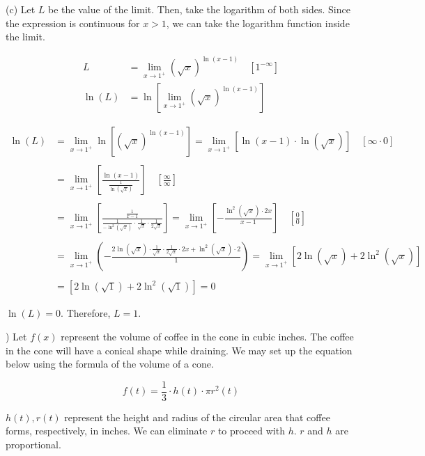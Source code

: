 \documentclass{article}
\begin{document}
\noindent (c) Let $L$ be the value of the limit. Then, take the logarithm of both sides. Since the expression is continuous for $x>1$, we can take the logarithm function inside the limit.

\begin{align*}
L&=\lim_{x\to1^+} (\sqrt x)^{\ln(x-1)}\quad \left[1^{-\infty}\right]\\
\ln(L) &= \ln\left[\lim_{x\to1^+} (\sqrt x)^{\ln(x-1)}\right]
\end{align*}

\begin{align*}
\ln(L)&=\lim_{x\to1^+}\ln\left[(\sqrt x)^{\ln(x-1)}\right]=\lim_{x\to1^+}\left[\ln(x-1)\cdot\ln(\sqrt x)\right]\quad\left[\infty \cdot 0\right]\\\\&=\lim_{x\to1^+}\left[\frac{\ln(x-1)}{\frac1{\ln\left(\sqrt x\right)}}\right]\quad\left[\frac\infty\infty\right]\\\\&=\lim_{x\to1^+}\left[\frac{\frac1{{x-1}}}{\frac1{-\ln^2\left(\sqrt x\right)}\cdot\frac1{\sqrt x}\cdot\frac1{2\sqrt x}}\right]=\lim_{x\to1^+}\left[-\frac{\ln^2(\sqrt x)\cdot 2x}{x-1}\right]\quad\left[\frac00\right]\\\\&=\lim_{x\to1^+}\left(-\frac{2\ln\left(\sqrt x\right)\cdot \frac1{\sqrt x}\cdot\frac1{2\sqrt x}\cdot2x+\ln^2 (\sqrt x)\cdot 2 }1\right)=\lim_{x\to1^+} \left[2\ln\left(\sqrt x\right) + 2\ln^2\left(\sqrt x\right) \right]\\\\&=\left[2\ln\left(\sqrt 1\right) + 2\ln^2\left(\sqrt 1\right) \right] = 0
\end{align*}

\hfill

\noindent $\ln(L) = 0$. Therefore, $\boxed{L=1}$.

\hfill

) Let $f(x)$ represent the volume of coffee in the cone in cubic inches. The coffee in the cone will have a conical shape while draining. We may set up the equation below using the formula of the volume of a cone.

\begin{equation*}f(t) = \frac13\cdot h(t)\cdot \pi r^2(t)\end{equation*}

\hfill

\noindent $h(t), r(t)$ represent the height and radius of the circular area that coffee forms, respectively, in inches. We can eliminate $r$ to proceed with $h$. $r$ and $h$ are proportional.
\end{document}
